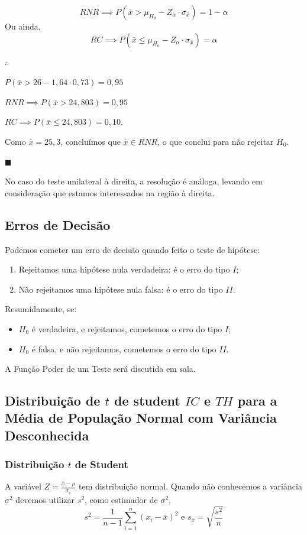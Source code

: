\documentclass[oneside,a4paper,12pt]{article}
\begin{document}
$$RNR \implies P(\bar{x} > \mu_{H_0} - Z_{\alpha} \cdot \sigma_{\bar{x}}) = 1 - \alpha$$
Ou ainda,
$$RC \implies P(\bar{x} \leq \mu_{H_0} - Z_{\alpha} \cdot \sigma_{\bar{x}}) = \alpha$$

$\therefore$

$P(\bar{x} > 26 - 1,64 \cdot 0,73) = 0,95$

$RNR \implies P(\bar{x} > 24,803) = 0,95$

$RC \implies P(\bar{x} \leq 24,803) = 0,10$.

Como $\bar{x} = 25,3$, concluímos que $\bar{x} \in RNR$, o que conclui para não rejeitar $H_0$.

\begin{flushright}
	$\blacksquare$
\end{flushright}

No caso do teste unilateral à direita, a resolução é análoga, levando em consideração que estamos interessados na região à direita.


\subsection{Erros de Decisão}

Podemos cometer um erro de decisão quando feito o teste de hipótese:
\begin{enumerate}
	\item Rejeitamos uma hipótese nula verdadeira: é o erro do tipo $I$;
	\item Não rejeitamos uma hipótese nula falsa: é o erro do tipo $II$.
\end{enumerate}

Resumidamente, se:
\begin{itemize}
	\item $H_0$ é verdadeira, e rejeitamos, cometemos o erro do tipo $I$;
	\item $H_0$ é falsa, e não rejeitamos, cometemos o erro do tipo $II$.
\end{itemize}

A Função Poder de um Teste será discutida em sala.

\subsection{Distribuição de $t$ de student $IC$ e $TH$ para a Média de População Normal com Variância Desconhecida}

\subsubsection{Distribuição $t$ de Student}
A variável $Z = \displaystyle \frac{\bar{x} - \mu}{\sigma_{\bar{x}}}$ tem distribuição normal. Quando não conhecemos a variância $\sigma^2$ devemos utilizar $s^2$, como estimador de $\sigma^2$.
$$s^2 = \displaystyle \frac{1}{n-1}\sum_{i=1}^{n}(x_i - \bar{x})^2 \text{ e } s_{\bar{x}}=\sqrt{\frac{s^2}{n}}$$
\end{document}

